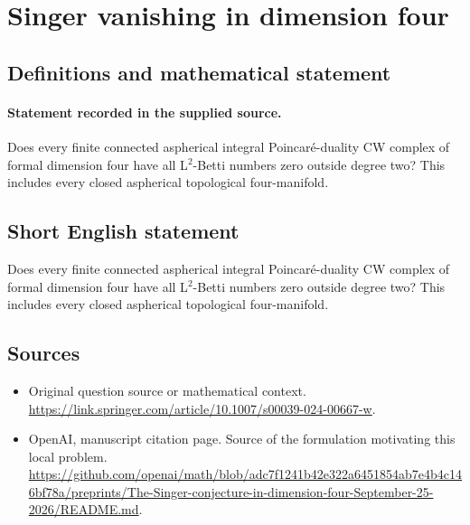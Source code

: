 \documentclass[11pt]{article}
\begin{document}
\section*{Singer vanishing in dimension four}\label{statement}
\subsection{Definitions and mathematical statement}
\paragraph{Statement recorded in the supplied source.}
Does every finite connected aspherical integral Poincaré-duality CW complex of formal dimension four have all L$^{2}$-Betti numbers zero outside degree two? This includes every closed aspherical topological four-manifold.
\subsection{Short English statement}
Does every finite connected aspherical integral Poincaré-duality CW complex of formal dimension four have all L$^{2}$-Betti numbers zero outside degree two? This includes every closed aspherical topological four-manifold.
\subsection{Sources}
\begin{itemize}
\item[S1] Original question source or mathematical context.
\url{https://link.springer.com/article/10.1007/s00039-024-00667-w}.
\item[S2] OpenAI, manuscript citation page. Source of the formulation motivating this local problem.
\url{https://github.com/openai/math/blob/adc7f1241b42e322a6451854ab7e4b4c146bf78a/preprints/The-Singer-conjecture-in-dimension-four-September-25-2026/README.md}.
\end{itemize}
\end{document}
